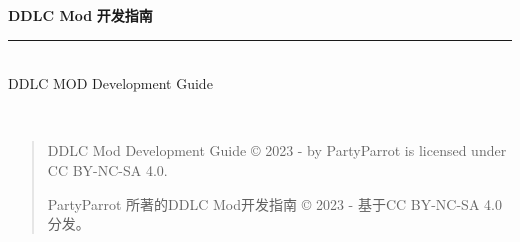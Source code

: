 \documentclass[../Main.tex]{subfiles}
\begin{document}
\thispagestyle{empty}

\begin{titlepage}{




\noindent\begin{minipage}{\textwidth}
\raggedright
{\fontsize{60pt}{1.2} \bfseries DDLC Mod}
\newline
\newline
{\fontsize{50pt}{1.2} \bfseries 开发指南}
\noindent\rule[-1ex]{\textwidth}{5pt}\\[2.5ex]
\Large {DDLC MOD Development Guide\newline} \hfill

{\bfseries {}}
\newline
{\bfseries {}}
\end{minipage}


\newpage
\thispagestyle{empty}
~\vfill
\begin{quote}\footnotesize\large
\noindent DDLC Mod Development Guide {\copyright} 2023 - {\the\year} by PartyParrot is licensed under CC BY-NC-SA 4.0.

\noindent PartyParrot 所著的DDLC Mod开发指南 {\copyright} 2023 - {\the\year}基于CC BY-NC-SA 4.0分发。
\end{quote}
}
\end{titlepage}
\end{document}
